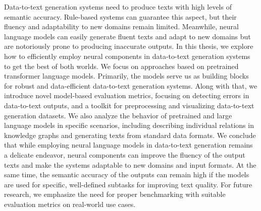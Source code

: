 Data-to-text generation systems need to produce texts with high levels of semantic accuracy. Rule-based systems can guarantee this aspect, but their fluency and adaptability to new domains remain limited. Meanwhile, neural language models can easily generate fluent texts and adapt to new domains but are notoriously prone to producing inaccurate outputs. In this thesis, we explore how to efficiently employ neural components in data-to-text generation systems to get the best of both worlds. We focus on approaches based on pretrained transformer language models. Primarily, the models serve us as building blocks for robust and data-efficient data-to-text generation systems. Along with that, we introduce novel model-based evaluation metrics, focusing on detecting errors in data-to-text outputs, and a toolkit for preprocessing and visualizing data-to-text generation datasets. We also analyze the behavior of pretrained and large language models in specific scenarios, including describing individual relations in knowledge graphs and generating texts from standard data formats. We conclude that while employing neural language models in data-to-text generation remains a delicate endeavor, neural components can improve the fluency of the output texts and make the systems adaptable to new domains and input formats. At the same time, the semantic accuracy of the outputs can remain high if the models are used for specific, well-defined subtasks for improving text quality. For future research, we emphasize the need for proper benchmarking with suitable evaluation metrics on real-world use cases.